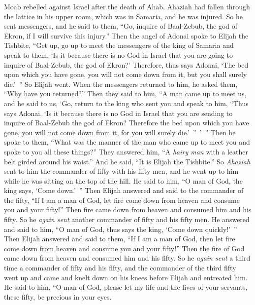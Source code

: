 
\begin{biblechapter} %
 Moab rebelled against Israel after the death of Ahab.
\verse Ahaziah had fallen through the lattice in his upper room, which was in Samaria, and he was injured. So he sent messengers, and he said to them, “Go, inquire of Baal-Zebub, the god of Ekron, if I will survive this injury.”
\verse Then the angel of Adonai spoke to Elijah the Tishbite, “Get up, go up to meet the messengers of the king of Samaria and speak to them, ‘Is it because there is no God in Israel that you are going to inquire of Baal-Zebub, the god of Ekron?’
\verse Therefore, thus says Adonai, ‘The bed upon which you have gone, you will not come down from it, but you shall surely die.’ ” So Elijah went.
\verse When the messengers returned to him, he asked them, “Why have you returned?”
\verse Then they said to him, “A man came up to meet us, and he said to us, ‘Go, return to the king who sent you and speak to him, “Thus says Adonai, ‘Is it because there is no God in Israel that you are sending to inquire of Baal-Zebub the god of Ekron? Therefore the bed upon which you have gone, you will not come down from it, for you will surely die.’ ” ’ ”
\verse Then he spoke to them, “What was the manner of the man who came up to meet you and spoke to you all these things?”
\verse They answered him, “A \textit{hairy man} with a leather belt girded around his waist.” And he said, “It is Elijah the Tishbite.”
\verse So \textit{Ahaziah} sent to him the commander of fifty with his fifty men, and he went up to him while he was sitting on the top of the hill. He said to him, “O man of God, the king says, ‘Come down.’ ”
\verse Then Elijah answered and said to the commander of the fifty, “If I am a man of God, let fire come down from heaven and consume you and your fifty!” Then fire came down from heaven and consumed him and his fifty.
\verse So he \textit{again sent} another commander of fifty and his fifty men. He answered and said to him, “O man of God, thus says the king, ‘Come down quickly!’ ”
\verse Then Elijah answered and said to them, “If I am a man of God, then let fire come down from heaven and consume you and your fifty!” Then the fire of God came down from heaven and consumed him and his fifty.
\verse So he \textit{again sent} a third time a commander of fifty and his fifty, and the commander of the third fifty went up and came and knelt down on his knees before Elijah and entreated him. He said to him, “O man of God, please let my life and the lives of your servants, these fifty, be precious in your eyes.

\end{biblechapter}
